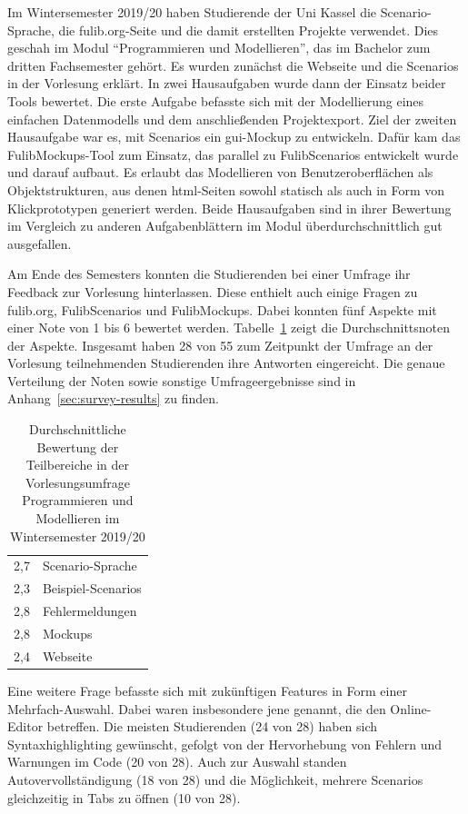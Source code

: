 Im Wintersemester 2019/20 haben Studierende der Uni Kassel die Scenario-Sprache, die fulib.org-Seite und die damit erstellten Projekte verwendet.
Dies geschah im Modul ``Programmieren und Modellieren'', das im Bachelor zum dritten Fachsemester gehört.
Es wurden zunächst die Webseite und die Scenarios in der Vorlesung erklärt.
In zwei Hausaufgaben wurde dann der Einsatz beider Tools bewertet.
Die erste Aufgabe befasste sich mit der Modellierung eines einfachen Datenmodells und dem anschließenden Projektexport.
Ziel der zweiten Hausaufgabe war es, mit Scenarios ein \ac{gui}-Mockup zu entwickeln.
Dafür kam das FulibMockups-Tool zum Einsatz, das parallel zu FulibScenarios entwickelt wurde und darauf aufbaut.
Es erlaubt das Modellieren von Benutzeroberflächen als Objektstrukturen, aus denen \ac{html}-Seiten sowohl statisch als auch in Form von Klickprototypen generiert werden.
Beide Hausaufgaben sind in ihrer Bewertung im Vergleich zu anderen Aufgabenblättern im Modul überdurchschnittlich gut ausgefallen.

Am Ende des Semesters konnten die Studierenden bei einer Umfrage ihr Feedback zur Vorlesung hinterlassen.
Diese enthielt auch einige Fragen zu fulib.org, FulibScenarios und FulibMockups.
Dabei konnten fünf Aspekte mit einer Note von 1 bis 6 bewertet werden.
Tabelle~\ref{tab:survey-results} zeigt die Durchschnittsnoten der Aspekte.
Insgesamt haben 28 von 55 zum Zeitpunkt der Umfrage an der Vorlesung teilnehmenden Studierenden ihre Antworten eingereicht.
Die genaue Verteilung der Noten sowie sonstige Umfrageergebnisse sind in Anhang~\ref{sec:survey-results} zu finden.

\begin{table}
    \caption{Durchschnittliche Bewertung der Teilbereiche in der Vorlesungsumfrage Programmieren und Modellieren im Wintersemester 2019/20}
    \label{tab:survey-results}
    \centering
    \begin{tabular}{rl}
        \toprule
        2,7 & Scenario-Sprache \\
        2,3 & Beispiel-Scenarios \\
        2,8 & Fehlermeldungen \\
        2,8 & Mockups \\
        2,4 & Webseite \\
        \bottomrule
    \end{tabular}
\end{table}

Eine weitere Frage befasste sich mit zukünftigen Features in Form einer Mehrfach-Auswahl.
Dabei waren insbesondere jene genannt, die den Online-Editor betreffen.
Die meisten Studierenden (24 von 28) haben sich Syntaxhighlighting gewünscht, gefolgt von der Hervorhebung von Fehlern und Warnungen im Code (20 von 28).
Auch zur Auswahl standen Autovervollständigung (18 von 28) und die Möglichkeit, mehrere Scenarios gleichzeitig in Tabs zu öffnen (10 von 28).

